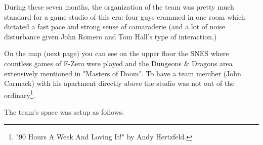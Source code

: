 \documentclass[book.tex]{subfiles}
\begin{document}
During these seven months, the organization of the team was pretty much standard for a game studio of this era: four guys crammed in one room which dictated a fast pace and strong sense of camaraderie (and a lot of noise disturbance given John Romero and Tom Hall's type of interaction.)\\
\par On the map (next page) you can see on the upper floor the SNES where countless games of F-Zero were played and the Dungeons \& Dragons area extensively mentioned in "Masters of Doom". To have a team member (John Carmack) with his apartment directly above the studio was not out of the ordinary\footnote{ "90 Hours A Week And Loving It!" by Andy Hertzfeld.}.\\
\par
The team's space was setup as follows.
\end{document}
